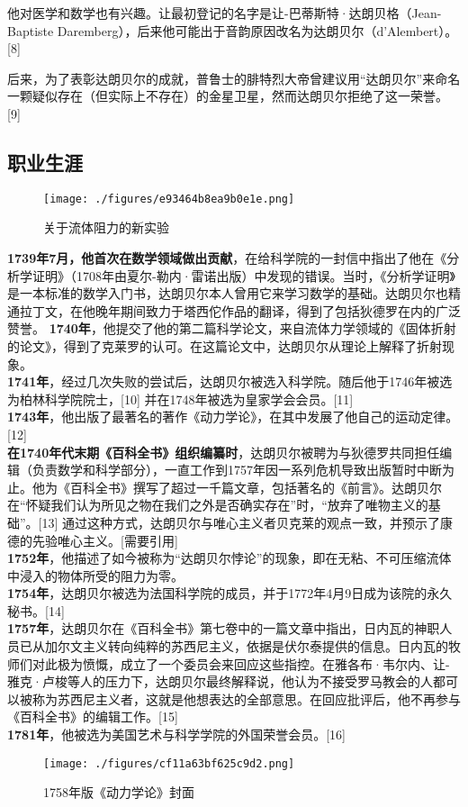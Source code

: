 他对医学和数学也有兴趣。让最初登记的名字是让-巴蒂斯特·达朗贝格（Jean-Baptiste Daremberg），后来他可能出于音韵原因改名为达朗贝尔（d’Alembert）。[8]

后来，为了表彰达朗贝尔的成就，普鲁士的腓特烈大帝曾建议用“达朗贝尔”来命名一颗疑似存在（但实际上不存在）的金星卫星，然而达朗贝尔拒绝了这一荣誉。[9]
\subsection{职业生涯}
\begin{figure}[ht]
\centering
\texttt{[image: ./figures/e93464b8ea9b0e1e.png]}
\caption{关于流体阻力的新实验} \label{fig_BR_2}
\end{figure}
\textbf{1739年7月，他首次在数学领域做出贡献}，在给科学院的一封信中指出了他在《分析学证明》（1708年由夏尔-勒内·雷诺出版）中发现的错误。当时，《分析学证明》是一本标准的数学入门书，达朗贝尔本人曾用它来学习数学的基础。达朗贝尔也精通拉丁文，在他晚年期间致力于塔西佗作品的翻译，得到了包括狄德罗在内的广泛赞誉。
\textbf{1740年}，他提交了他的第二篇科学论文，来自流体力学领域的《固体折射的论文》，得到了克莱罗的认可。在这篇论文中，达朗贝尔从理论上解释了折射现象。\\
\textbf{1741年}，经过几次失败的尝试后，达朗贝尔被选入科学院。随后他于1746年被选为柏林科学院院士，[10] 并在1748年被选为皇家学会会员。[11]\\
\textbf{1743年}，他出版了最著名的著作《动力学论》，在其中发展了他自己的运动定律。[12]\\
\textbf{在1740年代末期《百科全书》组织编纂时}，达朗贝尔被聘为与狄德罗共同担任编辑（负责数学和科学部分），一直工作到1757年因一系列危机导致出版暂时中断为止。他为《百科全书》撰写了超过一千篇文章，包括著名的《前言》。达朗贝尔在“怀疑我们认为所见之物在我们之外是否确实存在”时，“放弃了唯物主义的基础”。[13] 通过这种方式，达朗贝尔与唯心主义者贝克莱的观点一致，并预示了康德的先验唯心主义。[需要引用]\\
\textbf{1752年}，他描述了如今被称为“达朗贝尔悖论”的现象，即在无粘、不可压缩流体中浸入的物体所受的阻力为零。\\
\textbf{1754年}，达朗贝尔被选为法国科学院的成员，并于1772年4月9日成为该院的永久秘书。[14]\\
\textbf{1757年}，达朗贝尔在《百科全书》第七卷中的一篇文章中指出，日内瓦的神职人员已从加尔文主义转向纯粹的苏西尼主义，依据是伏尔泰提供的信息。日内瓦的牧师们对此极为愤慨，成立了一个委员会来回应这些指控。在雅各布·韦尔内、让-雅克·卢梭等人的压力下，达朗贝尔最终解释说，他认为不接受罗马教会的人都可以被称为苏西尼主义者，这就是他想表达的全部意思。在回应批评后，他不再参与《百科全书》的编辑工作。[15]\\
\textbf{1781年}，他被选为美国艺术与科学学院的外国荣誉会员。[16]
\begin{figure}[ht]
\centering
\texttt{[image: ./figures/cf11a63bf625c9d2.png]}
\caption{1758年版《动力学论》封面} \label{fig_BR_3}
\end{figure}
